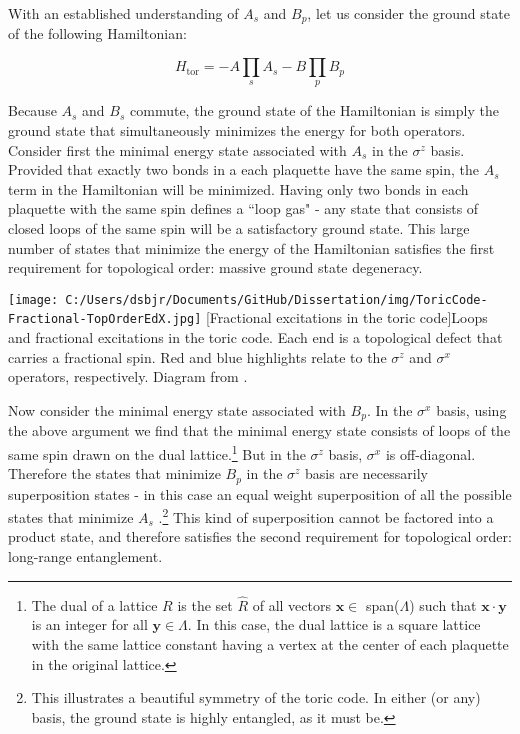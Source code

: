 With an established understanding of $A_{s}$ and $B_{p}$, let us consider the ground state of the following Hamiltonian:

\begin{equation}
H_{\text{tor}} = -A \prod_{s} A_{s} - B \prod_{p} B_{p}
\end{equation}

Because $A_{s}$ and $B_{s}$ commute, the ground state of the Hamiltonian is simply the ground state that simultaneously minimizes the energy for both operators. Consider first the minimal energy state associated with $A_{s}$ in the $\sigma^{z}$ basis. Provided that exactly two bonds in a each plaquette have the same spin, the $A_{s}$ term in the Hamiltonian will be minimized. Having only two bonds in each plaquette with the same spin defines a ``loop gas" - any state that consists of closed loops of the same spin will be a satisfactory ground state. This large number of states that minimize the energy of the Hamiltonian satisfies the first requirement for topological order: massive ground state degeneracy.

\begin{centering}
\texttt{[image: C:/Users/dsbjr/Documents/GitHub/Dissertation/img/ToricCode-Fractional-TopOrderEdX.jpg]}
  \captionsetup{width=0.75\textwidth}
  [Fractional excitations in the toric code]{Loops and fractional excitations in the toric code. Each end is a topological defect that carries a fractional spin. Red and blue highlights relate to the $\sigma^{z}$ and $\sigma^{x}$ operators, respectively. Diagram from \cite{topOrderEdX}.}
  \label{fig:toricCode2}
\end{centering}

Now consider the minimal energy state associated with $B_{p}$. In the $\sigma^{x}$ basis, using the above argument we find that the minimal energy state consists of loops of the same spin drawn on the dual lattice.\footnote{The dual of a lattice $R$ is the set $\hat{R}$ of all vectors $\mathbf{x} \in$ span($\Lambda$) such that $\mathbf{x} \cdot \mathbf{y}$ is an integer for all $\mathbf{y} \in \Lambda$. In this case, the dual lattice is a square lattice with the same lattice constant having a vertex at the center of each plaquette in the original lattice.} But in the $\sigma^{z}$ basis, $\sigma^{x}$ is off-diagonal. Therefore the states that minimize $B_{p}$ in the $\sigma^{z}$ basis are necessarily superposition states - in this case an equal weight superposition of all the possible states that minimize $A_{s}$ \cite{Savary2017}.\footnote{This illustrates a beautiful symmetry of the toric code. In either (or any) basis, the ground state is highly entangled, as it must be.} This kind of superposition cannot be factored into a product state, and therefore satisfies the second requirement for topological order: long-range entanglement.

